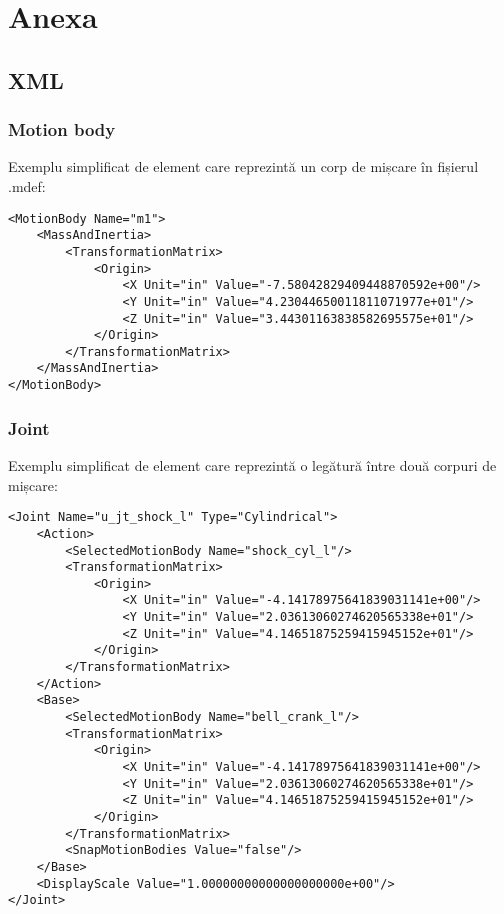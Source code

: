 \newpage
\section{Anexa}

\subsection{XML}
\subsubsection{Motion body}
Exemplu simplificat de element care reprezintă un corp de mișcare în fișierul .mdef:
\lstset{language=XML}
\begin{lstlisting}
<MotionBody Name="m1">
    <MassAndInertia>
        <TransformationMatrix>
            <Origin>
                <X Unit="in" Value="-7.58042829409448870592e+00"/>
                <Y Unit="in" Value="4.23044650011811071977e+01"/>
                <Z Unit="in" Value="3.44301163838582695575e+01"/>
            </Origin>
        </TransformationMatrix>
    </MassAndInertia>
</MotionBody>

\end{lstlisting}

\subsubsection{Joint}
Exemplu simplificat de element care reprezintă o legătură între două corpuri de mișcare:

\lstset{language=XML}
\begin{lstlisting}
<Joint Name="u_jt_shock_l" Type="Cylindrical">
    <Action>
        <SelectedMotionBody Name="shock_cyl_l"/>
        <TransformationMatrix>
            <Origin>
                <X Unit="in" Value="-4.14178975641839031141e+00"/>
                <Y Unit="in" Value="2.03613060274620565338e+01"/>
                <Z Unit="in" Value="4.14651875259415945152e+01"/>
            </Origin>
        </TransformationMatrix>
    </Action>
    <Base>
        <SelectedMotionBody Name="bell_crank_l"/>
        <TransformationMatrix>
            <Origin>
                <X Unit="in" Value="-4.14178975641839031141e+00"/>
                <Y Unit="in" Value="2.03613060274620565338e+01"/>
                <Z Unit="in" Value="4.14651875259415945152e+01"/>
            </Origin>
        </TransformationMatrix>
        <SnapMotionBodies Value="false"/>
    </Base>
    <DisplayScale Value="1.00000000000000000000e+00"/>
</Joint>
\end{lstlisting}

